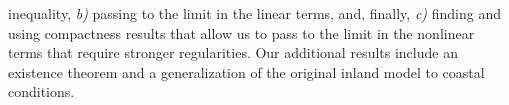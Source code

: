 \documentclass[twoside]{article}
\begin{document}
inequality, \textit{b)} passing to the limit in the linear terms, and, finally, \textit{c)} finding and using compactness results that allow us to pass to the limit in the nonlinear terms that require stronger regularities. Our additional results include an existence theorem and a generalization of the original inland model to coastal conditions.



\bigskip


\medskip

\end{document}
